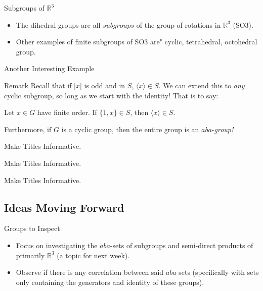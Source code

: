 \documentclass{beamer}
\begin{document}
\begin{frame}{Subgroups of $\mathbb{R}^3$ \hfill {}}
  \begin{itemize}
    \pause
    \item The dihedral groups are all $subgroups$ of the group of rotations in $\mathbb{R}^3$ (SO3).
    \pause
    \item Other examples of finite subgroups of SO3 are" \textcolor{dark-green}{cyclic, tetrahedral, octohedral group}.\newline
  \end{itemize}

\end{frame}

\begin{frame}{Another Interesting Example \hfill {}}
  \begin{block}{Remark}
    Recall that if $|x|$ is odd and in $S$, $\langle x \rangle \in S$. 
    \pause
    We can extend this to \textit{any} cyclic subgroup, so long as we start with the identity! That is to say:\newline

    Let $x \in G$ have finite order. If $\{1, x\} \in S$, then $\langle x \rangle \in S$.\newline 
    
    Furthermore, if $G$ is a cyclic group, then the entire group is an $aba$-\textit{group!}
  \end{block}
\end{frame}
\begin{frame}{Make Titles Informative.}
\end{frame}

\begin{frame}{Make Titles Informative.}
\end{frame}

\begin{frame}{Make Titles Informative.}
\end{frame}


\subsection{Ideas Moving Forward}

\begin{frame}{Groups to Inspect}
  \begin{itemize}
    \item Focus on investigating the $aba$-sets of subgroups and semi-direct products of primarily $\mathbb{R}^3$ (a topic for next week).
    \pause
    \item Observe if there is any correlation between said $aba$ sets (specifically with sets only containing the generators and identity of these groups).

  \end{itemize}
\end{frame}
\end{document}
